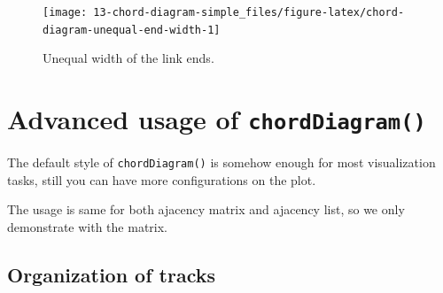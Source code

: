 \documentclass[]{book}
\newenvironment{Shaded}{\begin{snugshade}}{\end{snugshade}}
\newcommand{\KeywordTok}[1]{\textcolor[rgb]{0.13,0.29,0.53}{\textbf{#1}}}
\newcommand{\DataTypeTok}[1]{\textcolor[rgb]{0.13,0.29,0.53}{#1}}
\newcommand{\DecValTok}[1]{\textcolor[rgb]{0.00,0.00,0.81}{#1}}
\newcommand{\StringTok}[1]{\textcolor[rgb]{0.31,0.60,0.02}{#1}}
\newcommand{\CommentTok}[1]{\textcolor[rgb]{0.56,0.35,0.01}{\textit{#1}}}
\newcommand{\OperatorTok}[1]{\textcolor[rgb]{0.81,0.36,0.00}{\textbf{#1}}}
\newcommand{\NormalTok}[1]{#1}
\begin{document}
\begin{Shaded}
\end{Shaded}

\begin{figure}

{\centering \texttt{[image: 13-chord-diagram-simple\_files/figure-latex/chord-diagram-unequal-end-width-1]} 

}

\caption{Unequal width of the link ends.}\label{fig:chord-diagram-unequal-end-width}
\end{figure}

\chapter{\texorpdfstring{Advanced usage of
\texttt{chordDiagram()}}{Advanced usage of chordDiagram()}}\label{advanced-usage-of-chorddiagram}

The default style of \texttt{chordDiagram()} is somehow enough for most
visualization tasks, still you can have more configurations on the plot.

The usage is same for both ajacency matrix and ajacency list, so we only
demonstrate with the matrix.

\section{Organization of tracks}\label{organization-of-tracks}
\end{document}
